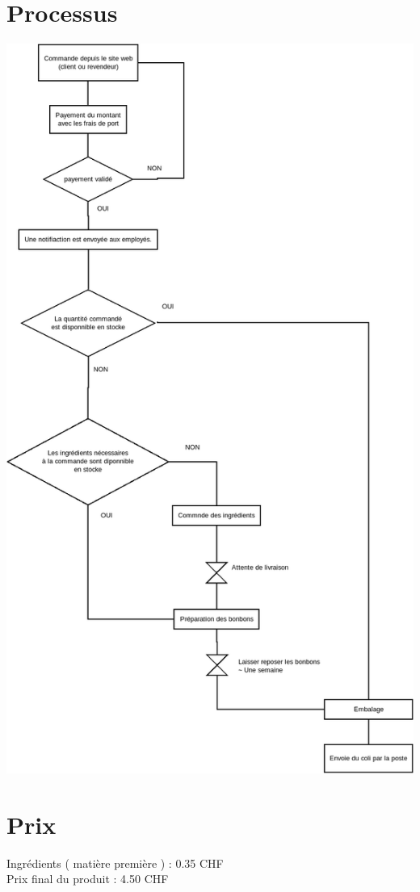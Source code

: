 \documentclass{article}
\begin{document}
\section{Processus}
\includegraphics[scale=0.4]{../processus_de_commande.png} 

\section{Prix}
Ingrédients ( matière première ) : 0.35 CHF \\
Prix final du produit :  4.50 CHF\\
\end{document}
